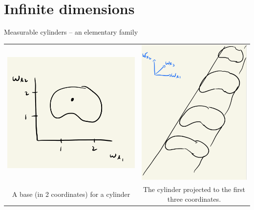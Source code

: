 \documentclass[10pt]{beamer}
\begin{document}
\section{Infinite dimensions}

\begin{frame}{Measurable cylinders -- an elementary family}
\begin{tabular}{cc}
\includegraphics[width=.4\textwidth]{images/cylinder_base_in_2_coordinates} &
  \includegraphics[width=.4\textwidth]{images/cylinder_projected_to_first_three_coordinates} \\
  \parbox[b]{0.4\linewidth}{A base (in 2 coordinates) for a cylinder} &  \parbox[b]{0.4\linewidth}{The cylinder projected to the first three coordinates.}
\end{tabular}
\end{frame}
\end{document}
